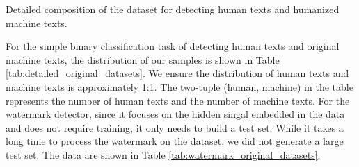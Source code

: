 \documentclass[11pt]{article}
\begin{document}
\begin{table}[ht]
	\centering
	\begin{minipage}[t]{0.58\textwidth} 
			\centering
			\caption{Detailed composition of the dataset for detecting human texts and humanized machine texts.}
			\label{tab:detailed_attack_datasets}
	\end{minipage}
	\hfill 
	\begin{minipage}[t]{0.38\textwidth}
			\centering
			\caption{Detailed composition of the humanized dataset for watermarks.}
			\label{tab:watermark_attack_datasets}
	\end{minipage}
\end{table}
For the simple binary classification task of detecting human texts and original machine texts, the distribution of our samples is shown in Table \ref{tab:detailed_original_datasets}. We ensure the distribution of human texts and machine texts is approximately 1:1. The two-tuple (human, machine) in the table represents the number of human texts and the number of machine texts. For the watermark detector, since it focuses on the hidden singal embedded in the data and does not require training, it only needs to build a test set. While it takes a long time to process the watermark on the dataset, we did not generate a large test set. The data are shown in Table \ref{tab:watermark_original_datasets}.
\end{document}
